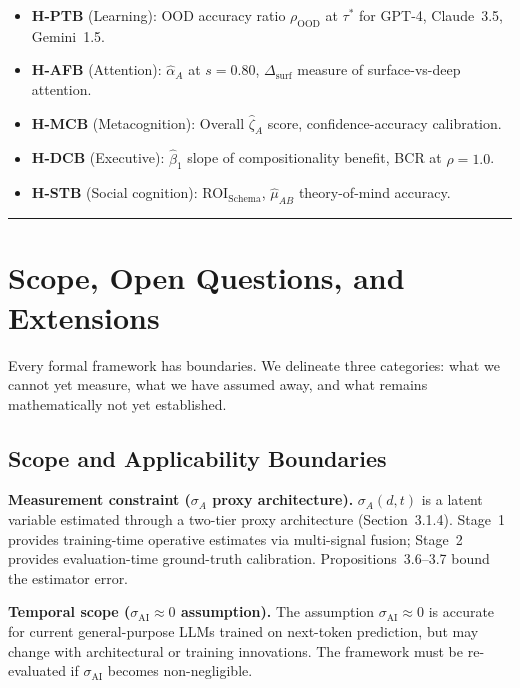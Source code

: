 \documentclass[10pt]{article}
\begin{document}
\begin{itemize}[nosep]
\item \textbf{H-PTB} (Learning): OOD accuracy ratio $\rho_{\text{OOD}}$
  at $\tau^*$ for GPT-4, Claude~3.5, Gemini~1.5.
\item \textbf{H-AFB} (Attention): $\hat{\alpha}_A$ at $s=0.80$,
  $\Delta_{\text{surf}}$ measure of surface-vs-deep attention.
\item \textbf{H-MCB} (Metacognition): Overall $\hat{\zeta}_A$ score,
  confidence-accuracy calibration.
\item \textbf{H-DCB} (Executive): $\hat{\beta}_1$ slope of
  compositionality benefit, BCR at $\rho=1.0$.
\item \textbf{H-STB} (Social cognition): ROI$_{\text{Schema}}$,
  $\hat{\mu}_{AB}$ theory-of-mind accuracy.
\end{itemize}

\noindent\rule{\linewidth}{0.4pt}

\section{Scope, Open Questions, and Extensions}\label{sec:limitations}

Every formal framework has boundaries. We delineate three categories: what we cannot yet measure, what we have assumed away, and what remains mathematically not yet established.

\subsection{Scope and Applicability Boundaries}\label{sec:scope}

\textbf{Measurement constraint ($\sigma_A$ proxy architecture).}
$\sigma_A(d,t)$ is a latent variable estimated through a two-tier proxy
architecture (Section~3.1.4). Stage~1 provides training-time operative
estimates via multi-signal fusion; Stage~2 provides evaluation-time
ground-truth calibration. Propositions~3.6--3.7 bound the estimator error.

\textbf{Temporal scope ($\sigma_{\text{AI}} \approx 0$ assumption).}
The assumption $\sigma_{\text{AI}} \approx 0$ is accurate for current
general-purpose LLMs trained on next-token prediction, but may change
with architectural or training innovations. The framework must be
re-evaluated if $\sigma_{\text{AI}}$ becomes non-negligible.
\end{document}
